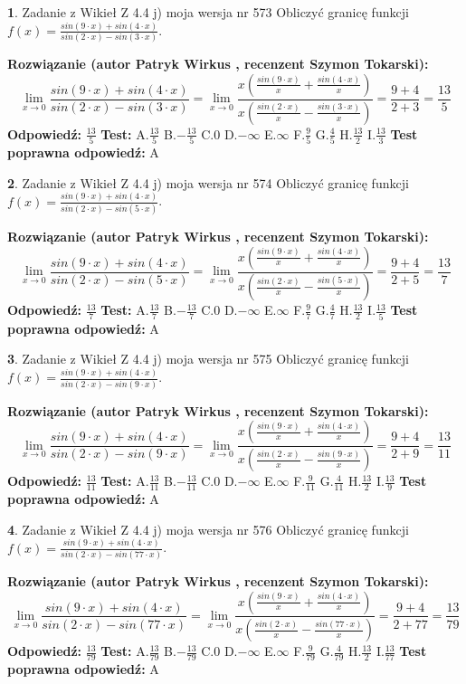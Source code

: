 \documentclass[12pt, a4paper]{article}
\theoremstyle{definition} %
\newtheorem{zad}{}
\newcommand{\zadStart}[1]{\begin{zad}#1\newline}
\newcommand{\zadStop}{\end{zad}}
\newcommand{\rozwStart}[2]{\noindent \textbf{Rozwiązanie (autor #1 , recenzent #2): }\newline}
\newcommand{\rozwStop}{\newline}
\newcommand{\odpStart}{\noindent \textbf{Odpowiedź:}\newline}
\newcommand{\odpStop}{\newline}
\newcommand{\testStart}{\noindent \textbf{Test:}\newline}
\newcommand{\testStop}{\newline}
\newcommand{\kluczStart}{\noindent \textbf{Test poprawna odpowiedź:}\newline}
\newcommand{\kluczStop}{\newline}
\begin{document}
\zadStart{Zadanie z Wikieł Z 4.4 j) moja wersja nr 573}
Obliczyć granicę funkcji $f(x)=\frac{sin(9\cdot x) +sin(4\cdot x)}{sin(2\cdot x) -sin(3\cdot x)}$.
\zadStop
\rozwStart{Patryk Wirkus}{Szymon Tokarski}
$$\lim\limits_{x\to 0}\frac{sin(9\cdot x) +sin(4\cdot x)}{sin(2\cdot x) -sin(3\cdot x)}=\lim\limits_{x\to 0}\frac{x(\frac{sin(9\cdot x)}{x}+\frac{sin(4\cdot x)}{x})}{x(\frac{sin(2\cdot x)}{x}-\frac{sin(3\cdot x)}{x})}=\frac{9+4}{2+3} = \frac{13}{5}$$
\rozwStop
\odpStart
$\frac{13}{5}$
\odpStop
\testStart
A.$\frac{13}{5}$
B.$-\frac{13}{5}$
C.$0$
D.$-\infty$
E.$\infty$
F.$\frac{9}{5}$
G.$\frac{4}{5}$
H.$\frac{13}{2}$
I.$\frac{13}{3}$
\testStop
\kluczStart
A
\kluczStop



\zadStart{Zadanie z Wikieł Z 4.4 j) moja wersja nr 574}
Obliczyć granicę funkcji $f(x)=\frac{sin(9\cdot x) +sin(4\cdot x)}{sin(2\cdot x) -sin(5\cdot x)}$.
\zadStop
\rozwStart{Patryk Wirkus}{Szymon Tokarski}
$$\lim\limits_{x\to 0}\frac{sin(9\cdot x) +sin(4\cdot x)}{sin(2\cdot x) -sin(5\cdot x)}=\lim\limits_{x\to 0}\frac{x(\frac{sin(9\cdot x)}{x}+\frac{sin(4\cdot x)}{x})}{x(\frac{sin(2\cdot x)}{x}-\frac{sin(5\cdot x)}{x})}=\frac{9+4}{2+5} = \frac{13}{7}$$
\rozwStop
\odpStart
$\frac{13}{7}$
\odpStop
\testStart
A.$\frac{13}{7}$
B.$-\frac{13}{7}$
C.$0$
D.$-\infty$
E.$\infty$
F.$\frac{9}{7}$
G.$\frac{4}{7}$
H.$\frac{13}{2}$
I.$\frac{13}{5}$
\testStop
\kluczStart
A
\kluczStop



\zadStart{Zadanie z Wikieł Z 4.4 j) moja wersja nr 575}
Obliczyć granicę funkcji $f(x)=\frac{sin(9\cdot x) +sin(4\cdot x)}{sin(2\cdot x) -sin(9\cdot x)}$.
\zadStop
\rozwStart{Patryk Wirkus}{Szymon Tokarski}
$$\lim\limits_{x\to 0}\frac{sin(9\cdot x) +sin(4\cdot x)}{sin(2\cdot x) -sin(9\cdot x)}=\lim\limits_{x\to 0}\frac{x(\frac{sin(9\cdot x)}{x}+\frac{sin(4\cdot x)}{x})}{x(\frac{sin(2\cdot x)}{x}-\frac{sin(9\cdot x)}{x})}=\frac{9+4}{2+9} = \frac{13}{11}$$
\rozwStop
\odpStart
$\frac{13}{11}$
\odpStop
\testStart
A.$\frac{13}{11}$
B.$-\frac{13}{11}$
C.$0$
D.$-\infty$
E.$\infty$
F.$\frac{9}{11}$
G.$\frac{4}{11}$
H.$\frac{13}{2}$
I.$\frac{13}{9}$
\testStop
\kluczStart
A
\kluczStop



\zadStart{Zadanie z Wikieł Z 4.4 j) moja wersja nr 576}
Obliczyć granicę funkcji $f(x)=\frac{sin(9\cdot x) +sin(4\cdot x)}{sin(2\cdot x) -sin(77\cdot x)}$.
\zadStop
\rozwStart{Patryk Wirkus}{Szymon Tokarski}
$$\lim\limits_{x\to 0}\frac{sin(9\cdot x) +sin(4\cdot x)}{sin(2\cdot x) -sin(77\cdot x)}=\lim\limits_{x\to 0}\frac{x(\frac{sin(9\cdot x)}{x}+\frac{sin(4\cdot x)}{x})}{x(\frac{sin(2\cdot x)}{x}-\frac{sin(77\cdot x)}{x})}=\frac{9+4}{2+77} = \frac{13}{79}$$
\rozwStop
\odpStart
$\frac{13}{79}$
\odpStop
\testStart
A.$\frac{13}{79}$
B.$-\frac{13}{79}$
C.$0$
D.$-\infty$
E.$\infty$
F.$\frac{9}{79}$
G.$\frac{4}{79}$
H.$\frac{13}{2}$
I.$\frac{13}{77}$
\testStop
\kluczStart
A
\kluczStop
\end{document}
